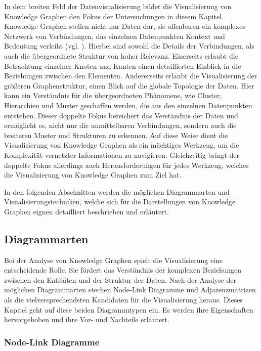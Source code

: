 In dem breiten Feld der Datenvisualisierung bildet die Visualisierung von Knowledge Graphen den Fokus der Untersuchungen in diesem Kapitel. Knowledge Graphen stellen nicht nur Daten dar, sie offenbaren ein komplexes Netzwerk von Verbindungen, das einzelnen Datenpunkten Kontext und Bedeutung verleiht (vgl. \cite{knowledgeGraph:whatIs}). Hierbei sind sowohl die Details der Verbindungen, als auch die übergeordnete Struktur von hoher Relevanz. Einerseits erlaubt die Betrachtung einzelner Knoten und Kanten einen detaillierten Einblick in die Beziehungen zwischen den Elementen. Andererseits erlaubt die Visualisierung der größeren Graphenstruktur, einen Blick auf die globale Topologie der Daten. Hier kann ein Verständnis für die übergeordneten Phänomene, wie Cluster, Hierarchien und Muster geschaffen werden, die aus den einzelnen Datenpunkten entstehen. Dieser doppelte Fokus bereichert das Verständnis der Daten und ermöglicht es, nicht nur die unmittelbaren Verbindungen, sondern auch die breiteren Muster und Strukturen zu erkennen. Auf diese Weise dient die Visualisierung von Knowledge Graphen als ein mächtiges Werkzeug, um die Komplexität vernetzter Informationen zu navigieren. Gleichzeitig bringt der doppelte Fokus allerdings auch Herausforderungen für jedes Werkzeug, welches die Visualisierung von Knowledge Graphen zum Ziel hat.

In den folgenden Abschnitten werden die möglichen Diagrammarten und Visualisierungstechniken, welche sich für die Darstellungen von Knowledge Graphen eignen detailliert beschrieben und erläutert.

\subsection{Diagrammarten}
\label{theory:visualization:types}

Bei der Analyse von Knowledge Graphen spielt die Visualisierung eine entscheidende Rolle. Sie fördert das Verständnis der komplexen Beziehungen zwischen den Entitäten und der Struktur der Daten. Nach der Analyse der möglichen Diagrammarten stechen Node-Link Diagramme und Adjazenzmatrizen als die vielversprechendsten Kandidaten für die Visualisierung heraus. Dieses Kapitel geht auf diese beiden  Diagrammtypen ein. Es werden ihre Eigenschaften hervorgehoben und ihre Vor- und Nachteile erläutert.

\subsubsection{Node-Link Diagramme}

